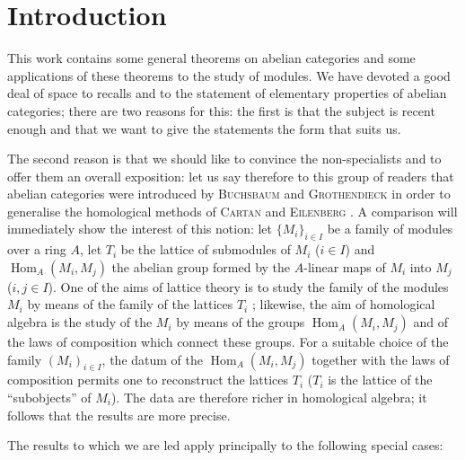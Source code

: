 
\chapter*{Introduction}

This work contains some general theorems on abelian categories and some
applications of these theorems to the study of modules. We have devoted a
good deal of space to recalls and to the statement of elementary properties
of abelian categories; there are two reasons for this: the first is that the
subject is recent enough and that we want to give the statements the form
that suits us.

The second reason is that we should like to convince the non-specialists and
to offer them an overall exposition: let us say therefore to this group of
readers that abelian categories were introduced by \textsc{Buchsbaum} and
\textsc{Grothendieck} in order to generalise the homological methods of
\textsc{Cartan} and \textsc{Eilenberg} \cite{cartan-eilenberg}. A comparison will immediately
show the interest of this notion: let $\{M_i\}_{i\in I}$ be a family of
modules over a ring $A$, let $T_i$ be the lattice of submodules of $M_i$
($i\in I$) and $\operatorname{Hom}_A(M_i,M_j)$ the abelian group formed by
the $A$-linear maps of $M_i$ into $M_j$ ($i,j\in I$). One of the aims of
lattice theory is to study the family of the modules $M_i$ by means of the
family of the lattices $T_i$ \cite{chevalley-grothendieck}; likewise, the aim of homological algebra is
the study of the $M_i$ by means of the groups
$\operatorname{Hom}_A(M_i,M_j)$ and of the laws of composition which connect
these groups. For a suitable choice of the family $(M_i)_{i\in I}$, the
datum of the $\operatorname{Hom}_A(M_i,M_j)$ together with the laws of
composition permits one to reconstruct the lattices $T_i$ ($T_i$ is the
lattice of the ``subobjects'' of $M_i$). The data are therefore richer in
homological algebra; it follows that the results are more precise.

The results to which we are led apply principally to the following special
cases:

